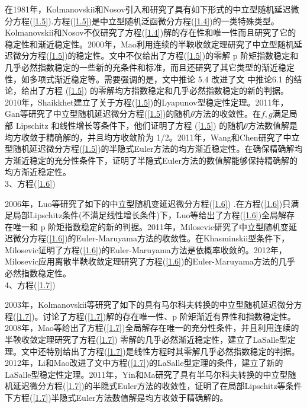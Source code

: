             在1981年，Kolmanovskii和Nosov\cite{1981.Kolmanovskii}引入和研究了具有如下形式的中立型随机延迟微分方程(\ref{1.5}).方程(\ref{1.5})是中立型随机泛函微分方程(\ref{1.4})的一类特殊类型。Kolmanovskii和Nosov不仅研究了方程(\ref{1.4})解的存在性和唯一性而且研究了它的稳定性和渐近稳定性。2000年，Mao\cite{2000.Mao}利用连续的半鞅收敛定理研究了中立型随机延迟微分方程(\ref{1.5})的稳定性。文\cite{2000.Mao}中不仅给出了方程(\ref{1.5})的零解 p 阶矩指数稳定和几乎必然指数稳定的一些新的充条件和标准，而且还研究了其它类型的渐近稳定性，如多项式渐近稳定等。需要强调的是，文\cite{2000.Mao}中推论 5.4 改进了文\cite{1997.Mao} 中推论6.1 的结论，给出了方程 (\ref{1.5}) 的零解均方指数稳定和几乎必然指数稳定的新的判据。2010年，Shaikkhet\cite{2010.Shaikkhet}建立了关于方程(\ref{1.5})的Lyapunov型稳定性定理。2011年，Gan\cite{2011.Gan}等研究了中立型随机延迟微分方程(\ref{1.5})的随机$\theta$方法的收敛性。在$ f,g $满足局部 Lipschitz 和线性增长等条件下，他们证明了方程 (\ref{1.5}) 的随机$\theta$方法数值解是均方收敛于精确解的，并且均方收敛阶为 1/2。2011年，Wang和Chen\cite{2011.Wang}研究了中立型随机延迟微分方程(\ref{1.5})的半隐式Euler方法的均方渐近稳定性。在确保精确解均方渐近稳定的充分性条件下，证明了半隐式Euler方法的数值解能够保持精确解的均方渐近稳定性。\\
            3、方程(\ref{1.6})
            \par
            2006年，Luo\cite{2006.Luo}等研究了如下的中立型随机变延迟微分方程(\ref{1.6}) .在方程(\ref{1.6})只满足局部Lipschitz条件(不满足线性增长条件)下，Luo等给出了方程(\ref{1.6})全局解存在唯一和 p 阶矩指数稳定的新的判据。2011年，Milosevic\cite{2011.Milosevic}研究了中立型随机变延迟微分方程(\ref{1.6})的Euler-Maruyama方法的收敛性。在Khasminskii型条件下，Milosevic证明了方程(\ref{1.6})的Euler-Maruyama方法是依概率收敛的。2012年，Milosevic\cite{2013.Milosevic}应用离散半鞅收敛定理研究了方程(\ref{1.6})的Euler-Maruyama方法的几乎必然指数稳定性。\\
            4、方程(\ref{1.7})
            \par
            2003年，Kolmanovskii\cite{2003.Kolmanovskii}等研究了如下的具有马尔科夫转换的中立型随机延迟微分方程(\ref{1.7})。讨论了方程(\ref{1.7})解的存在唯一性、p 阶矩渐近有界性和指数稳定性。2008年，Mao\cite{2008.MaoX}等给出了方程(\ref{1.7})全局解存在唯一的充分性条件，并且利用连续的半鞅收敛定理研究了方程(\ref{1.7})
            零解的几乎必然渐近稳定性，建立了LaSalle型定理。文\cite{2008.MaoX}中还特别给出了方程(\ref{1.7})是线性方程时其零解几乎必然指数稳定的判据。2012年，Li和Mao\cite{2012.MaoX}改进了文\cite{2008.MaoX}中方程(\ref{1.7})的LaSalle型定理的条件，建立了新的LaSalle型稳定性定理。2011年，Yin和Ma\cite{2011.Yin}研究了具有半马尔科夫转换的中立型随机延迟微分方程(\ref{1.7})的半隐式Euler方法的收敛性，证明了在局部Lipschitz等条件下方程(\ref{1.7})半隐式Euler方法数值解是均方收敛于精确解的。
